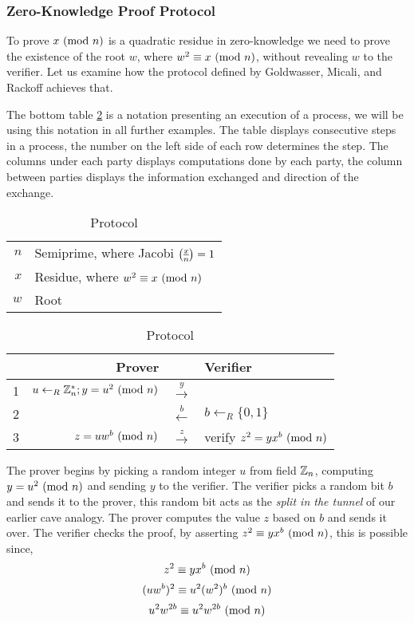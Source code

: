 \newpage
\subsubsection{Zero-Knowledge Proof Protocol}
To prove $x \ (\mathrm{mod}\ n)$ is a quadratic residue in zero-knowledge we need to prove the existence of the root $w$, where $w^2 \equiv x \ (\mathrm{mod}\ n)$, without revealing $w$ to the verifier.
Let us examine how the protocol \cite{goldwasser1989knowledge} defined by Goldwasser, Micali, and Rackoff achieves that.

%
%
%


\bigskip
\noindent
The bottom table \ref{table:zkp-qrp} is a notation presenting an execution of a process, we will be using this notation in all further examples.
The table displays consecutive steps in a process, the number on the left side of each row determines the step.
The columns under each party displays computations done by each party, the column between parties displays the information exchanged and direction of the exchange.
\bigskip
\begin{table}[h!]
	\centering
	\begin{tabular}{rl}
		$n$ & Semiprime, where Jacobi $\legendre{x}{n} = 1$\\
 		$x$ & Residue, where $w^2 \equiv x \ (\mathrm{mod}\ n)$\\
 		$w$ & Root\\
	\end{tabular}
	\caption{Protocol}
	\medskip
	\begin{tabular}{r|r|c|l}
	\label{table:zkp-qrp}
		& Prover && Verifier\\
		\hline
		1&$u \leftarrow_R \Bbb{Z}_{n}^{*}; y = u^2 \ (\mathrm{mod}\ n)$ & $\xrightarrow{y}$\\
		2 & & $\xleftarrow{b}$ & $b \leftarrow_R \{0, 1\} $\\
		3 &$z = uw^b\ (\mathrm{mod}\ n)$ & $\xrightarrow z$ & verify $z^2 = yx^b \ (\mathrm{mod}\ n)$\\
	\end{tabular}
\end{table}

\bigskip \noindent
The prover begins by picking a random integer $u$ from field $\Bbb{Z}_{n}$, computing $y = u^2 \ (\mathrm{mod}\ n)$ and sending $y$ to the verifier.
The verifier picks a random bit $b$ and sends it to the prover, this random bit acts as the \textit{split in the tunnel} of our earlier cave analogy.
The prover computes the value $z$ based on $b$ and sends it over.
The verifier checks the proof, by asserting $z^2 \equiv yx^b \ (\mathrm{mod}\ n)$, this is possible since,
$$z^2 \equiv yx^b \ (\mathrm{mod}\ n)$$
$$(uw^b)^2 \equiv u^2(w^2)^b \ (\mathrm{mod}\ n)$$
$$u^2w^{2b} \equiv u^2w^{2b} \ (\mathrm{mod}\ n)$$

